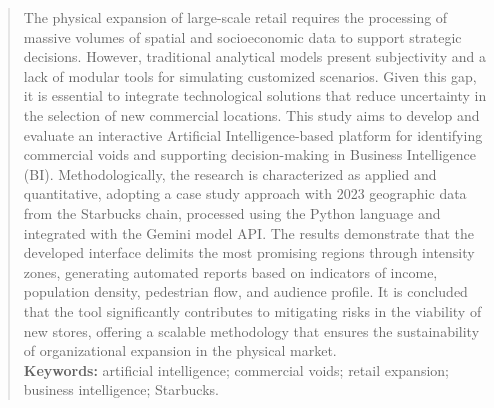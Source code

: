 \documentclass[a4paper,12pt]{article}
\newcommand{\keyword}[1]{\textsf{#1}}
\begin{document}
\begin{abstract}
\noindent
The physical expansion of large-scale retail requires the processing of massive volumes of spatial and socioeconomic data to support strategic decisions. However, traditional analytical models present subjectivity and a lack of modular tools for simulating customized scenarios. Given this gap, it is essential to integrate technological solutions that reduce uncertainty in the selection of new commercial locations. This study aims to develop and evaluate an interactive Artificial Intelligence-based platform for identifying commercial voids and supporting decision-making in Business Intelligence (BI). Methodologically, the research is characterized as applied and quantitative, adopting a case study approach with 2023 geographic data from the Starbucks chain, processed using the Python language and integrated with the Gemini model API. The results demonstrate that the developed interface delimits the most promising regions through intensity zones, generating automated reports based on indicators of income, population density, pedestrian flow, and audience profile. It is concluded that the tool significantly contributes to mitigating risks in the viability of new stores, offering a scalable methodology that ensures the sustainability of organizational expansion in the physical market.
\\\textbf{\keyword{Keywords:}} artificial intelligence; commercial voids; retail expansion; business intelligence; Starbucks.
\end{abstract}

 \onehalfspace  %
 \setlength{\parindent}{1.25cm}






 \newpage
{}



\end{document}
